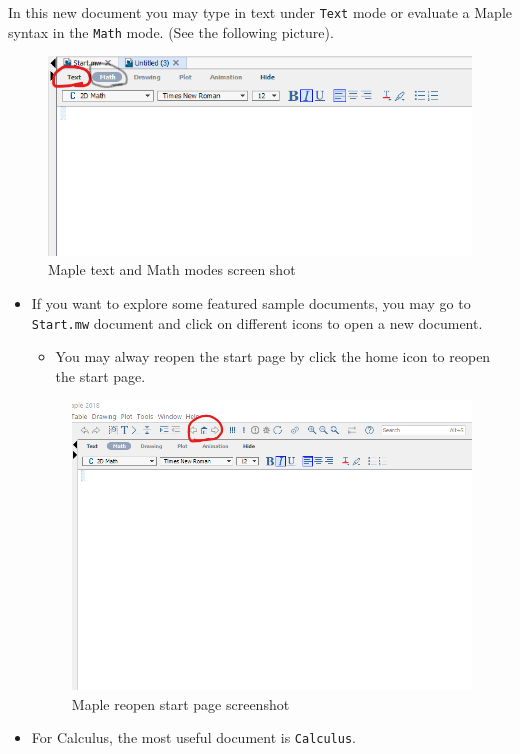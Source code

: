 \documentclass[]{book}
\providecommand{\tightlist}{%
  \setlength{\itemsep}{0pt}\setlength{\parskip}{0pt}}
\theoremstyle{definition}
\theoremstyle{definition}
\theoremstyle{definition}
\theoremstyle{remark}
\begin{document}
In this new document you may type in text under \texttt{Text} mode or evaluate a Maple syntax in the \texttt{Math} mode. (See the following picture).

\begin{figure}
\centering
\includegraphics{figs/Text-Math-Mode.png}
\caption{Maple text and Math modes screen shot}
\end{figure}

\begin{itemize}
\item
  If you want to explore some featured sample documents, you may go to \texttt{Start.mw} document and click on different icons to open a new document.

  \begin{itemize}
  \tightlist
  \item
    You may alway reopen the start page by click the home icon to reopen the start page.
  \end{itemize}

  \begin{figure}
  \centering
  \includegraphics{figs/Home-reopen-start-page.png}
  \caption{Maple reopen start page screenshot}
  \end{figure}
\item
  For Calculus, the most useful document is \texttt{Calculus}.
\end{itemize}
\end{document}
